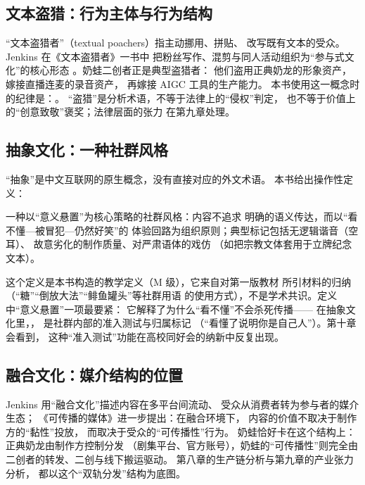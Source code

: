 \subsection{文本盗猎：行为主体与行为结构}

“文本盗猎者”（textual poachers）指主动挪用、拼贴、
改写既有文本的受众。Jenkins 在《文本盗猎者》一书中
把粉丝写作、混剪与同人活动组织为“参与式文化”的核心形态
\cite{jenkins1992poachers}。奶蛙二创者正是典型盗猎者：
他们盗用正典奶龙的形象资产，嫁接直播连麦的录音资产，
再嫁接 AIGC 工具的生产能力。
本书使用这一概念时的纪律是：。
“盗猎”是分析术语，不等于法律上的“侵权”判定，
也不等于价值上的“创意致敬”褒奖；法律层面的张力
在第九章处理。

\subsection{抽象文化：一种社群风格}

“抽象”是中文互联网的原生概念，没有直接对应的外文术语。
本书给出操作性定义：

\begin{definition}[抽象（抽象文化）]\label{def:02:abstract}
  一种以“意义悬置”为核心策略的社群风格：内容不追求
  明确的语义传达，而以“看不懂—被冒犯—仍然好笑”的
  体验回路为组织原则；典型标记包括无逻辑谐音（空耳）、
  故意劣化的制作质量、对严肃语体的戏仿
  （如把宗教文体套用于立牌纪念文本）。
\end{definition}

这个定义是本书构造的教学定义（M 级），它来自对第一版教材
所引材料的归纳（“糖”“倒放大法”“鲱鱼罐头”等社群用语
的使用方式），不是学术共识。定义中“意义悬置”一项最要紧：
它解释了为什么“看不懂”不会杀死传播——
在抽象文化里，，
是社群内部的准入测试与归属标记
（“看懂了说明你是自己人”）。第十章会看到，
这种“准入测试”功能在高校同好会的纳新中反复出现。

\subsection{融合文化：媒介结构的位置}

Jenkins 用“融合文化”描述内容在多平台间流动、
受众从消费者转为参与者的媒介生态\cite{jenkins2006convergence}；
《可传播的媒体》进一步提出：在融合环境下，
内容的价值不取决于制作方的“黏性”投放，
而取决于受众的“可传播性”行为\cite{jenkins2013spreadable}。
奶蛙恰好卡在这个结构上：正典奶龙由制作方控制分发
（剧集平台、官方账号），奶蛙的“可传播性”则完全由
二创者的转发、二创与线下搬运驱动。
第八章的生产链分析与第九章的产业张力分析，
都以这个“双轨分发”结构为底图。

